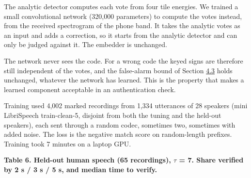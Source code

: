 \documentclass[10pt,a4paper]{article}
\begin{document}
The analytic detector computes each vote from four tile energies. We trained a small convolutional network (320,000 parameters) to compute the votes instead, from the received spectrogram of the phone band. It takes the analytic votes as an input and adds a correction, so it starts from the analytic detector and can only be judged against it. The embedder is unchanged.

The network never sees the code. For a wrong code the keyed signs are therefore still independent of the votes, and the false-alarm bound of Section \hyperref[s-4-3]{4.3} holds unchanged, whatever the network has learned. This is the property that makes a learned component acceptable in an authentication check.

Training used 4,002 marked recordings from 1,334 utterances of 28 speakers (mini LibriSpeech train-clean-5, disjoint from both the tuning and the held-out speakers), each sent through a random codec, sometimes two, sometimes with added noise. The loss is the negative match score on random-length prefixes. Training took 7 minutes on a laptop GPU.

\begin{center}\small {}\label{t-6}\textbf{Table 6. Held-out human speech (65 recordings), $\tau$ = 7. Share verified by 2 s / 3 s / 5 s, and median time to verify.}\end{center}
\end{document}
